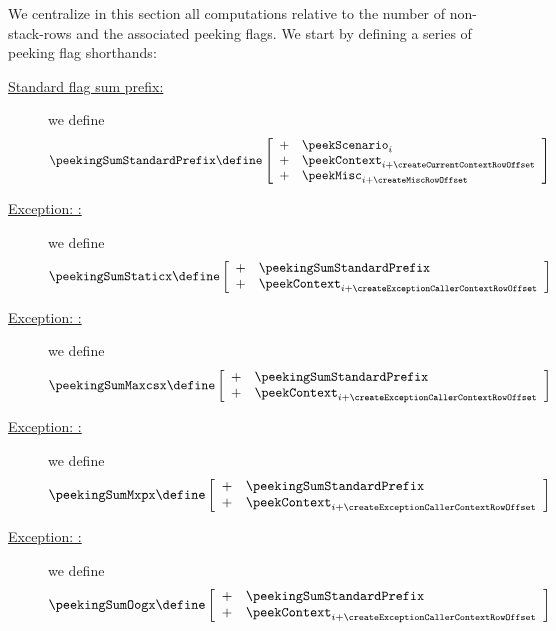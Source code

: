 We centralize in this section all computations relative to the number of non-stack-rows and the associated peeking flags.
We start by defining a series of peeking flag shorthands:
\begin{description}
	\item[\underline{Standard flag sum prefix:}]
		we define
		\[
			\peekingSumStandardPrefix
			\define
			\left[ \begin{array}{ll}
				+ & \peekScenario     _{i}     \\
				+ & \peekContext      _{i + \createCurrentContextRowOffset} \\
				+ & \peekMisc         _{i + \createMiscRowOffset} \\
			\end{array} \right]
		\]
	\item[\underline{Exception: \staticxSH{}:}]
		we define
		\[
			\peekingSumStaticx
			\define
			\left[ \begin{array}{ll}
				+ & \peekingSumStandardPrefix  \\
				+ & \peekContext      _{i + \createExceptionCallerContextRowOffset} \\
			\end{array} \right]
		\]
	\item[\underline{Exception: \maxcsxSH{}:}]
		we define
		\[
			\peekingSumMaxcsx
			\define
			\left[ \begin{array}{ll}
				+ & \peekingSumStandardPrefix  \\
				+ & \peekContext      _{i + \createExceptionCallerContextRowOffset} \\
			\end{array} \right]
		\]
	\item[\underline{Exception: \mxpxSH{}:}]
		we define
		\[
			\peekingSumMxpx
			\define
			\left[ \begin{array}{ll}
				+ & \peekingSumStandardPrefix  \\
				+ & \peekContext      _{i + \createExceptionCallerContextRowOffset} \\
			\end{array} \right]
		\]
	\item[\underline{Exception: \oogxSH{}:}]
		we define
		\[
			\peekingSumOogx
			\define
			\left[ \begin{array}{ll}
				+ & \peekingSumStandardPrefix  \\
				+ & \peekContext      _{i + \createExceptionCallerContextRowOffset} \\
			\end{array} \right]
\]
\end{description}
